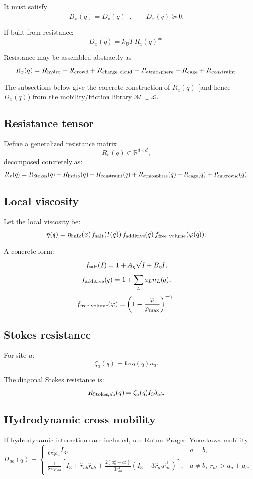 \documentclass[11pt]{article}
\begin{document}
It must satisfy
\[
D_x(q)=D_x(q)^\top,
\qquad
D_x(q)\succeq0.
\]

If built from resistance:
\[
D_x(q)=k_BT\,R_x(q)^\#.
\]

Resistance may be assembled abstractly as
\[
R_x(q)
=
R_{\rm hydro}
+
R_{\rm crowd}
+
R_{\rm charge\ cloud}
+
R_{\rm atmosphere}
+
R_{\rm cage}
+
R_{\rm constraint}.
\]

The subsections below give the concrete construction of \(R_x(q)\) (and hence
\(D_x(q)\)) from the mobility/friction library \(\mathcal M\subset\mathcal L\).

\subsection{Resistance tensor}

Define a generalized resistance matrix
\[
R_x(q)\in\mathbb R^{d\times d},
\]
decomposed concretely as:
\[
R_x(q)
=
R_{\rm Stokes}(q)
+
R_{\rm hydro}(q)
+
R_{\rm constraint}(q)
+
R_{\rm atmosphere}(q)
+
R_{\rm cage}(q)
+
R_{\rm microvisc}(q).
\]

\subsection{Local viscosity}

Let the local viscosity be:
\[
\eta(q)
=
\eta_{\rm bulk}(x)
\,
f_{\rm salt}(I(q))
\,
f_{\rm additive}(q)
\,
f_{\rm free\ volume}(\varphi(q)).
\]

A concrete form:
\[
f_{\rm salt}(I)=1+A_{\eta}\sqrt{I}+B_{\eta}I,
\]
\[
f_{\rm additive}(q)
=
1+
\sum_L a_L n_L(q),
\]
\[
f_{\rm free\ volume}(\varphi)
=
\left(1-\frac{\varphi}{\varphi_{\max}}\right)^{-\gamma}.
\]

\subsection{Stokes resistance}

For site \(a\):
\[
\zeta_a(q)=6\pi\eta(q)a_a.
\]

The diagonal Stokes resistance is:
\[
R_{\rm Stokes,ab}(q)
=
\zeta_a(q)I_3\delta_{ab}.
\]

\subsection{Hydrodynamic cross mobility}

If hydrodynamic interactions are included, use Rotne--Prager--Yamakawa mobility
\[
H_{ab}(q)
=
\begin{cases}
\frac{1}{6\pi\eta a_a}I_3, & a=b,\\[4pt]
\frac{1}{8\pi\eta r_{ab}}
\left[
I_3+\hat r_{ab}\hat r_{ab}^{\top}
+
\frac{2(a_a^2+a_b^2)}{3r_{ab}^2}
\left(
I_3-3\hat r_{ab}\hat r_{ab}^{\top}
\right)
\right], & a\ne b,\ r_{ab}>a_a+a_b.
\end{cases}
\]
\end{document}
